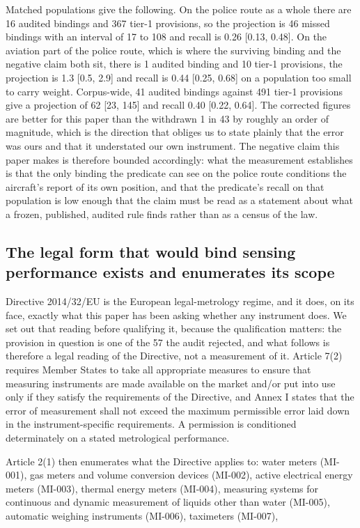 Matched populations give the following. On the police route as a whole there are 16 audited bindings and 367 tier-1 provisions, so the projection is 46 missed bindings with an interval of 17 to 108 and recall is 0.26 [0.13, 0.48]. On the aviation part of the police route, which is where the surviving binding and the negative claim both sit, there is 1 audited binding and 10 tier-1 provisions, the projection is 1.3 [0.5, 2.9] and recall is 0.44 [0.25, 0.68] on a population too small to carry weight. Corpus-wide, 41 audited bindings against 491 tier-1 provisions give a projection of 62 [23, 145] and recall 0.40 [0.22, 0.64]. The corrected figures are better for this paper than the withdrawn 1 in 43 by roughly an order of magnitude, which is the direction that obliges us to state plainly that the error was ours and that it understated our own instrument. The negative claim this paper makes is therefore bounded accordingly: what the measurement establishes is that the only binding the predicate can see on the police route conditions the aircraft's report of its own position, and that the predicate's recall on that population is low enough that the claim must be read as a statement about what a frozen, published, audited rule finds rather than as a census of the law.

\subsection{The legal form that would bind sensing performance exists and enumerates its scope}\label{sec:3.5}

Directive 2014/32/EU is the European legal-metrology regime, and it does, on its face, exactly what this paper has been asking whether any instrument does. We set out that reading before qualifying it, because the qualification matters: the provision in question is one of the 57 the audit rejected, and what follows is therefore a legal reading of the Directive, not a measurement of it. Article 7(2) requires Member States to take all appropriate measures to ensure that measuring instruments are made available on the market and/or put into use only if they satisfy the requirements of the Directive, and Annex I states that the error of measurement shall not exceed the maximum permissible error laid down in the instrument-specific requirements. A permission is conditioned determinately on a stated metrological performance.

Article 2(1) then enumerates what the Directive applies to: water meters (MI-001), gas meters and volume conversion devices (MI-002), active electrical energy meters (MI-003), thermal energy meters (MI-004), measuring systems for continuous and dynamic measurement of liquids other than water (MI-005), automatic weighing instruments (MI-006), taximeters (MI-007),

